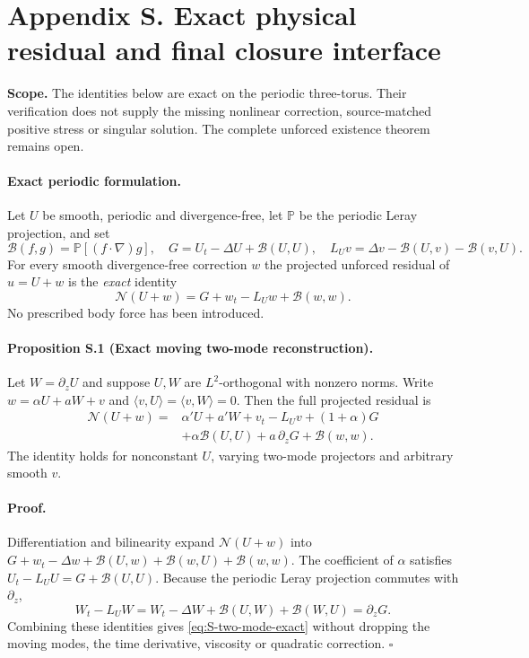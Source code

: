 \clearpage
\section*{Appendix S. Exact physical residual and final closure interface}
\noindent\textbf{Scope.} The identities below are exact on the periodic
three-torus. Their verification does not supply the missing nonlinear
correction, source-matched positive stress or singular solution.
The complete unforced existence theorem remains open.

\paragraph{Exact periodic formulation.}
Let $U$ be smooth, periodic and divergence-free, let $\mathbb P$
be the periodic Leray projection, and set
\[
 \mathcal B(f,g)=\mathbb P[(f\cdot\nabla)g],\quad
 G=U_t-\Delta U+\mathcal B(U,U),\quad
 L_Uv=\Delta v-\mathcal B(U,v)-\mathcal B(v,U).
\]
For every smooth divergence-free correction $w$ the projected
unforced residual of $u=U+w$ is the \emph{exact} identity
\begin{equation}\label{eq:S-unforced-expansion}
 \mathcal N(U+w)=G+w_t-L_Uw+\mathcal B(w,w).
\end{equation}
No prescribed body force has been introduced.

\paragraph{Proposition S.1 (Exact moving two-mode reconstruction).}
Let $W=\partial_zU$ and suppose $U,W$ are $L^2$-orthogonal with
nonzero norms. Write $w=\alpha U+aW+v$ and
$\langle v,U\rangle=\langle v,W\rangle=0$.
Then the full projected residual is
\begin{equation}\label{eq:S-two-mode-exact}
\boxed{\begin{aligned}
\mathcal N(U+w)={}&
 \alpha' U+a'W+v_t-L_Uv
 +(1+\alpha)G\\
 &+\alpha\mathcal B(U,U)
 +a\,\partial_zG+\mathcal B(w,w).
\end{aligned}}
\end{equation}
The identity holds for nonconstant $U$, varying two-mode projectors
and arbitrary smooth $v$.

\paragraph{Proof.}
Differentiation and bilinearity expand
$\mathcal N(U+w)$ into
$G+w_t-\Delta w+\mathcal B(U,w)+\mathcal B(w,U)+\mathcal B(w,w)$.
The coefficient of $\alpha$ satisfies
$U_t-L_UU=G+\mathcal B(U,U)$.
Because the periodic Leray projection commutes with $\partial_z$,
\[
 W_t-L_UW
 =W_t-\Delta W+\mathcal B(U,W)+\mathcal B(W,U)
 =\partial_zG.
\]
Combining these identities gives
\eqref{eq:S-two-mode-exact} without dropping the moving modes,
the time derivative, viscosity or quadratic correction.
\hfill$\square$

